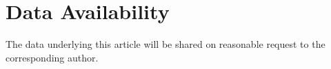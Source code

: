 \documentclass[usenatbib,useAMS]{mnras}
\begin{document}
\section*{Data Availability}
The data underlying this article will be shared on
reasonable request to the corresponding author.









\bsp	%
\label{lastpage}
\end{document}
